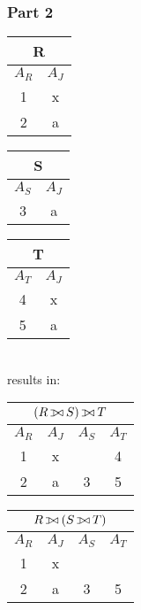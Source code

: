\documentclass[11pt,a4paper]{scrartcl}
\def\ojoin{\setbox0=\hbox{$\bowtie$}%
  \rule[-.02ex]{.25em}{.4pt}\llap{\rule[\ht0]{.25em}{.4pt}}}
\def\leftouterjoin{\mathbin{\ojoin\mkern-5.8mu\bowtie}}
\begin{document}
\subsubsection*{Part 2}

\begin{minipage}{.2\textwidth}
\begin{tabular}{|c|c|}
\hline
  \multicolumn{2}{|c|}{R} \\
  \hline
  $A_R$ & $A_J$\\ \hline \hline
  1 & x\\
  2 & a\\
  \hline
\end{tabular}
\end{minipage}
\begin{minipage}{.2\textwidth}
\begin{tabular}{|c|c|}
\hline
  \multicolumn{2}{|c|}{S} \\
  \hline
  $A_S$ & $A_J$\\ \hline \hline
  3 & a\\
  \hline
\end{tabular}
\end{minipage}
\begin{minipage}{.2\textwidth}
\begin{tabular}{|c|c|}
\hline
  \multicolumn{2}{|c|}{T} \\
  \hline
  $A_T$ & $A_J$\\ \hline \hline
  4 & x\\
  5 & a\\
  \hline
\end{tabular}
\end{minipage}\\

results in:\\

\begin{minipage}{.3\textwidth}
\begin{tabular}{|c|c|c|c|}
\hline
  \multicolumn{4}{|c|}{$(R \leftouterjoin S)\leftouterjoin T$} \\
  \hline
  $A_R$ & $A_J$ & $A_S$ & $A_T$\\ \hline \hline
  1 & x & & 4\\
  2 & a & 3 & 5\\
  \hline
\end{tabular}
\end{minipage}
\begin{minipage}{.3\textwidth}
\begin{tabular}{|c|c|c|c|}
\hline
  \multicolumn{4}{|c|}{$R \leftouterjoin (S\leftouterjoin T)$} \\
  \hline
$A_R$ & $A_J$ & $A_S$ & $A_T$\\ \hline \hline
  1 & x & & \\
  2 & a & 3 & 5\\
  \hline
\end{tabular}
\end{minipage}\\
\end{document}
